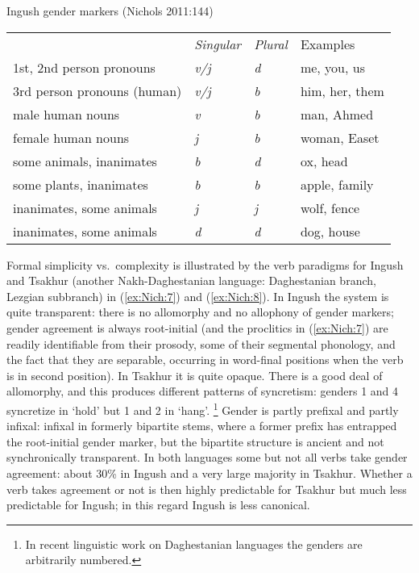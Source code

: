 \documentclass[output=collectionpaper]{langsci/langscibook}
\begin{document}
\ea
\label{ex:Nich:6}
Ingush gender markers (Nichols 2011:144)\\
\begin{tabular}{l>{\itshape}l>{\itshape}ll}
					 &	{\normalfont Singular} &	{\normalfont Plural} &	{\normalfont Examples} \\
1st, 2nd person pronouns & 			v/j	 &	d  &		me, you, us \\
3rd person pronouns (human) 	 &	v/j	 &	b 	 &	him, her, them \\
male human nouns 			 &	v 	 &	b 	 &	man, Ahmed \\
female human nouns			  &	j 	 &	b 	 &	woman, Easet \\
some animals, inanimates 		 &	b  &		d  &		ox, head \\
some plants, inanimates	 &		b 		 &b	 &	apple, family \\
inanimates, some animals  &			j 	 &	j  &		wolf, fence \\
inanimates, some animals  &			d 	 &	d  &		dog, house \\
\end{tabular}
\z

Formal simplicity vs.\ complexity is illustrated by the verb paradigms for Ingush and Tsakhur (another Nakh-Daghestanian language: Daghestanian branch, Lezgian subbranch) in (\ref{ex:Nich:7}) and (\ref{ex:Nich:8}). In Ingush the system is quite transparent: there is no allomorphy and no allophony of gender markers; gender agreement is always root-initial (and the proclitics in (\ref{ex:Nich:7}) are readily identifiable from their prosody, some of their segmental phonology, and the fact that they are separable, occurring in word-final positions when the verb is in second position). In Tsakhur it is quite opaque. There is a good deal of allomorphy, and this produces different patterns of syncretism: genders 1 and 4 syncretize in `hold' but 1 and 2 in `hang'.%
\footnote{%
In recent linguistic work on Daghestanian languages the genders are arbitrarily numbered.
} %
Gender is partly prefixal and partly infixal: infixal in formerly bipartite stems, where a former prefix has entrapped the root-initial gender marker, but the bipartite structure is ancient and not synchronically transparent. In both languages some but not all verbs take gender agreement: about 30\% in Ingush and a very large majority in Tsakhur. Whether a verb takes agreement or not is then highly predictable for Tsakhur but much less predictable for Ingush; in this regard Ingush is less canonical.
\end{document}
